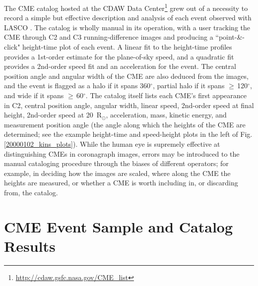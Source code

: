 \documentclass[referee,a4paper,12pt,traditabstract]{swsc}
\begin{document}
\begin{linenumbers}
The CME catalog hosted at the CDAW Data Center\footnote{\href{http://cdaw.gsfc.nasa.gov/CME_list}{http://cdaw.gsfc.nasa.gov/CME\_list}}  grew out of a necessity to record a simple but effective description and analysis of each event observed with LASCO \citep{2009EM&P..104..295G}. The catalog is wholly manual in its operation, with a user tracking the CME through C2 and C3 running-difference images and producing a ``point-\&-click" height-time plot of each event. A linear fit to the height-time profiles provides a 1st-order estimate for the plane-of-sky speed, and a quadratic fit provides a 2nd-order speed fit and an acceleration for the event. The central position angle and angular width of the CME are also deduced from the images, and the event is flagged as a halo if it spans 360$^{\circ}$, partial halo if it spans $\ge$\,120$^{\circ}$, and wide if it spans $\ge$\,60$^{\circ}$. The catalog itself lists each CME's first appearance in C2, central position angle, angular width, linear speed, 2nd-order speed at final height, 2nd-order speed at 20~R$_{\odot}$, acceleration, mass, kinetic energy, and measurement position angle (the angle along which the heights of the CME are determined; see the example height-time and speed-height plots in the left of Fig.\,\ref{20000102_kins_plots}). While the human eye is supremely effective at distinguishing CMEs in coronagraph images, errors may be introduced to the manual cataloging procedure through the biases of different operators; for example, in deciding how the images are scaled, where along the CME the heights are measured, or whether a CME is worth including in, or discarding from, the catalog.


\section{CME Event Sample and Catalog Results}
\label{sect_events}


\end{linenumbers}
\end{document}
